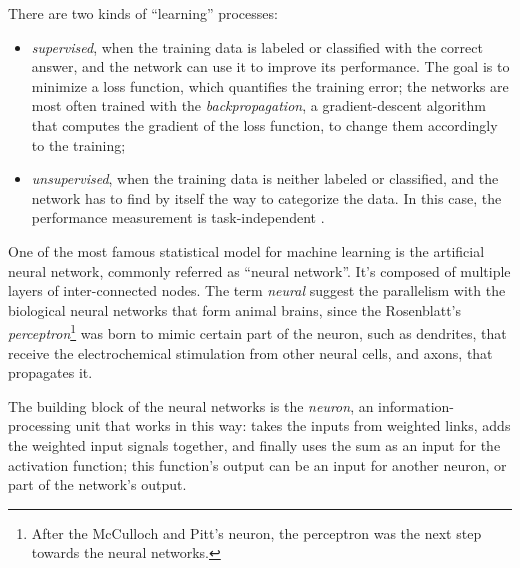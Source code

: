 There are two kinds of ``learning'' processes:
\begin{itemize}
	\item \textit{supervised}, when the training data is labeled or classified with the correct answer, and the network can use it to improve its performance. The goal is to minimize a loss function, which quantifies the training error; the networks are most often trained with the \textit{backpropagation}, a gradient-descent algorithm that computes the gradient of the loss function, to change them accordingly to the training;
	\item \textit{unsupervised}, when the training data is neither labeled or classified, and the network has to find by itself the way to categorize the data. In this case, the performance measurement is task-independent \cite{Hay08}.
\end{itemize}
One of the most famous statistical model for machine learning is the artificial neural network, commonly referred as ``neural network''. It's composed of multiple layers of inter-connected nodes. The term \textit{neural} suggest the parallelism with the biological neural networks that form animal brains, since the Rosenblatt's \textit{perceptron}\footnote{After the McCulloch and Pitt’s neuron, the perceptron was the next step towards the neural networks.} was born to mimic certain part of the neuron, such as dendrites, that receive the electrochemical stimulation from other neural cells, and axons, that propagates it.

The building block of the neural networks is the \textit{neuron}, an information-processing unit that works in this way: takes the inputs from weighted links, adds the weighted input signals together, and finally uses the sum as an input for the activation function; this function's output can be an input for another neuron, or part of the network's output.

